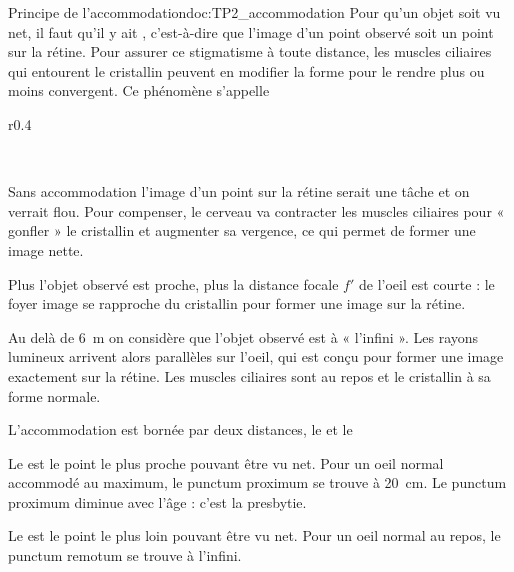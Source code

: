 \begin{doc}{Principe de l'accommodation}{doc:TP2_accommodation}
  Pour qu'un objet soit vu net, il faut qu'il y ait , c'est-à-dire que l'image d'un point observé soit un point sur la rétine.
  Pour assurer ce stigmatisme à toute distance, les muscles ciliaires qui entourent le cristallin peuvent en modifier la forme pour le rendre plus ou moins convergent.
  Ce phénomène s'appelle 

  \begin{wrapfigure}[19]{r}{0.4\linewidth}
    \vspace*{-20pt}
    \centering
     \\
    
     \\
  \end{wrapfigure}

  \pointCyan {}
  
  Sans accommodation l'image d'un point sur la rétine serait une tâche et on verrait flou.
  Pour compenser, le cerveau va contracter les muscles ciliaires pour « gonfler » le cristallin et augmenter sa vergence, ce qui permet de former une image nette.

  Plus l'objet observé est proche, plus la distance focale $f'$ de l'oeil est courte : le foyer image se rapproche du cristallin pour former une image sur la rétine.
  
  \pointCyan {}
  
  Au delà de \qty{6}{\m} on considère que l'objet observé est à « l'infini ».
  Les rayons lumineux arrivent alors parallèles sur l'oeil, qui est conçu pour former une image exactement sur la rétine.
  Les muscles ciliaires sont au repos et le cristallin à sa forme normale.

  \pointCyan {}
  
  L'accommodation est bornée par deux distances, le  et le 
  \begin{listePoints}
    \item Le  est le point le plus proche pouvant être vu net.
    Pour un oeil normal accommodé au maximum, le punctum proximum se trouve à \qty{20}{\cm}.
    Le punctum proximum diminue avec l'âge : c'est la presbytie.
  \end{listePoints}
  
  \begin{listePoints}
    \item Le  est le point le plus loin pouvant être vu net.
    Pour un oeil normal au repos, le punctum remotum se trouve à l'infini.
  \end{listePoints}
\end{doc}

